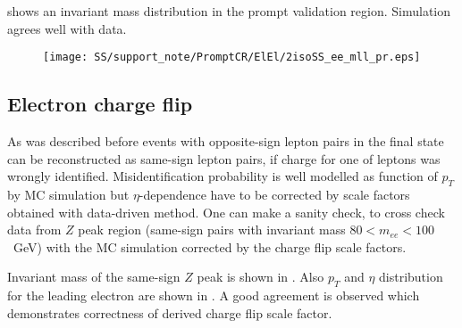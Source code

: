 \begin{table*}[htbp]
\caption{Ratio between observed and expected same-sign pairs in the $WZ$ and $ZZ$ control region for various cuts on the dielectron invariant mass. 
The uncertainties account for both statistical and systematic errors.}
\begin{center}
\end{center}
\label{tab:prompt_ratios}
\end{table*}

 shows an invariant mass distribution in the prompt validation region.
Simulation agrees well with data.

\begin{figure}[h]
\begin{center}
\texttt{[image: SS/support\_note/PromptCR/ElEl/2isoSS\_ee\_mll\_pr.eps]}
\caption{\toDo}
\label{fig:prompt_CR}
\end{center}
\end{figure} 


\subsection{Electron charge flip}

As was described before events with opposite-sign lepton pairs in the final state can be reconstructed as same-sign lepton pairs, if charge for one of leptons was wrongly identified.
Misidentification probability is well modelled as function of $p_T$ by MC simulation 
but $\eta$-dependence have to be corrected by scale factors obtained with data-driven method.
One can make a sanity check, to cross check data from $Z$ peak region (same-sign pairs with invariant mass $80 < m_{ee} < 100$~GeV)
with the MC simulation corrected by the charge flip scale factors.

Invariant mass of the same-sign $Z$ peak is shown in . 
Also $p_T$ and $\eta$ distribution for the leading electron are shown in .
A good agreement is observed which demonstrates correctness of derived charge flip scale factor.

